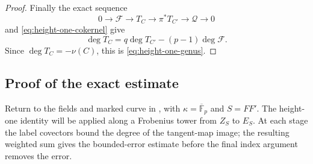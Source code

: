 \begin{proof}
Finally the exact sequence
\[
 0\longrightarrow\mathcal F\longrightarrow T_C
 \longrightarrow\pi^*T_{C'}\longrightarrow\mathcal Q
 \longrightarrow0
\]
and \eqref{eq:height-one-cokernel} give
\[
 \deg T_C=q\deg T_{C'}-(p-1)\deg\mathcal F.
\]
Since $\deg T_C=-\nu(C)$, this is \eqref{eq:height-one-genus}.
\end{proof}

\subsection{Proof of the exact estimate}

Return to the fields and marked curve in
, with $\kappa=\overline{\mathbb F}_p$
and $S=FF'$. The height-one identity will be applied along a
Frobenius tower from $Z_S$ to $E_S$. At each stage the label
covectors bound the degree of the tangent-map image; the resulting
weighted sum gives the bounded-error estimate before the final
index argument removes the error.

